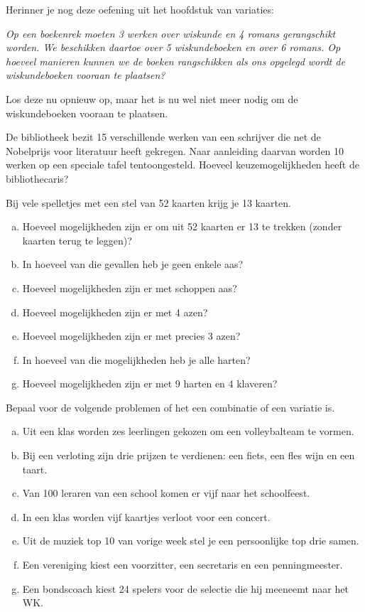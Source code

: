 \documentclass[12pt,a4,twoside]{article}
\begin{document}
\begin{oefening}
Herinner je nog deze oefening uit het hoofdstuk van variaties:

{\em Op een boekenrek moeten 3 werken over wiskunde en 4 romans gerangschikt worden. We beschikken daartoe over 5 wiskundeboeken en over 6 romans. Op hoeveel manieren kunnen we de boeken rangschikken als ons opgelegd wordt de wiskundeboeken vooraan te plaatsen?}

Los deze nu opnieuw op, maar het is nu wel niet meer nodig om de wiskundeboeken vooraan te plaatsen.
\end{oefening}

\begin{oefening}
De bibliotheek bezit 15 verschillende werken van een schrijver die net de Nobelprijs voor literatuur heeft gekregen. Naar aanleiding daarvan worden 10 werken op een speciale tafel tentoongesteld. Hoeveel keuzemogelijkheden heeft de bibliothecaris?
\end{oefening}

\begin{oefening}
Bij vele spelletjes met een stel van 52 kaarten krijg je 13 kaarten.
\begin{enumerate}[(a)]
  \item Hoeveel mogelijkheden zijn er om uit 52 kaarten er 13 te trekken (zonder kaarten terug te leggen)?
  \item In hoeveel van die gevallen heb je geen enkele aas?
  \item Hoeveel mogelijkheden zijn er met schoppen aas?
  \item Hoeveel mogelijkheden zijn er met 4 azen?
  \item Hoeveel mogelijkheden zijn er met precies 3 azen?
  \item In hoeveel van die mogelijkheden heb je alle harten?
  \item Hoeveel mogelijkheden zijn er met 9 harten en 4 klaveren?
\end{enumerate}
\end{oefening}

\begin{oefening}
Bepaal voor de volgende problemen of het een combinatie of een variatie is.
\begin{enumerate}[(a)]
  \item Uit een klas worden zes leerlingen gekozen om een volleybalteam te vormen.
  \item Bij een verloting zijn drie prijzen te verdienen: een fiets, een fles wijn en een taart.
  \item Van 100 leraren van een school komen er vijf naar het schoolfeest.
  \item In een klas worden vijf kaartjes verloot voor een concert.
  \item Uit de muziek top 10 van vorige week stel je een persoonlijke top drie samen.
  \item Een vereniging kiest een voorzitter, een secretaris en een penningmeester.
  \item Een bondscoach kiest 24 spelers voor de selectie die hij meeneemt naar het WK.
\end{enumerate}
\end{oefening}
\end{document}
